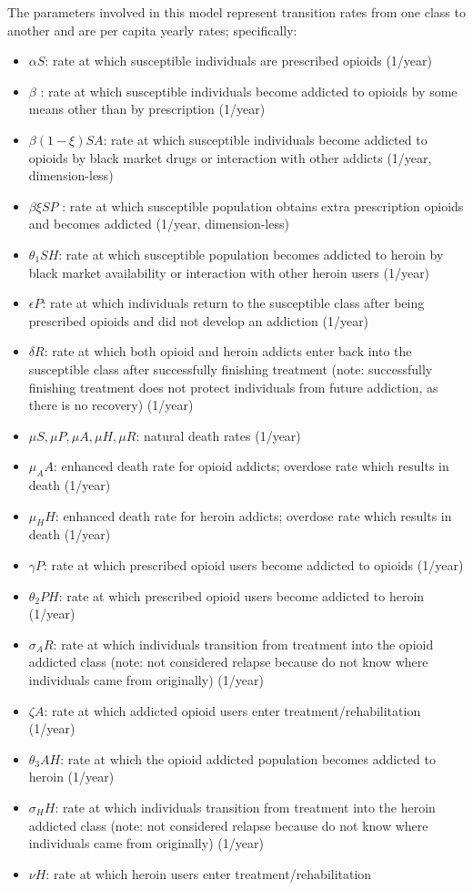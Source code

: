 \documentclass[12pt]{article}
\begin{document}
The parameters involved in this model represent transition rates from one class to another and are per capita yearly rates; specifically: 
\begin{itemize}
\item $\alpha S$: rate at which susceptible individuals are prescribed opioids (1/year)
\item $\beta$ : rate at which susceptible individuals become addicted to opioids by some means other than by prescription (1/year)
\item $\beta(1-\xi) SA$: rate at which susceptible individuals become addicted to opioids by black market drugs or interaction with other addicts (1/year, dimension-less)
\item $\beta \xi SP$ : rate at which susceptible population obtains extra prescription opioids and becomes addicted  (1/year, dimension-less)
\item $\theta_1 SH$: rate at which susceptible population becomes addicted to heroin by black market availability or interaction with other heroin users  (1/year)
\item $\epsilon P$: rate at which individuals return to the susceptible class after being prescribed opioids and did not develop an addiction (1/year) 
\item $\delta R$: rate at which both opioid and heroin addicts enter back into the susceptible class after successfully finishing treatment (note: successfully finishing treatment does not protect individuals from future addiction, as there is no recovery) (1/year) 
\item $\mu S, \mu P, \mu A, \mu H, \mu R$: natural death rates (1/year)
\item $\mu_A A$: enhanced death rate for opioid addicts; overdose rate which results in death (1/year)
\item $\mu_H H$: enhanced death rate for heroin addicts; overdose rate which results in death (1/year)
\item $\gamma P$: rate at which prescribed opioid users become addicted to opioids (1/year)
\item $\theta_2 PH$: rate at which prescribed opioid users become addicted to heroin (1/year)
\item $\sigma_A R$: rate at which individuals transition from treatment into the opioid addicted class (note: not considered relapse because do not know where individuals came from originally) (1/year)
\item $\zeta A$: rate at which addicted opioid users enter treatment/rehabilitation (1/year)
\item $\theta_3 AH$: rate at which the opioid addicted population becomes addicted to heroin  (1/year)
\item$\sigma_H H$: rate at which individuals transition from treatment into the heroin addicted class (note: not considered relapse because do not know where individuals came from originally) (1/year)
\item $\nu H$: rate at which heroin users enter treatment/rehabilitation 
\end{itemize}
\end{document}
